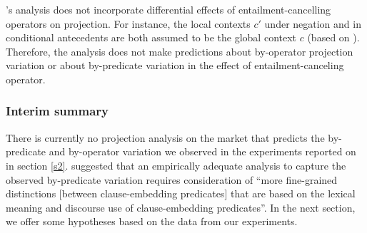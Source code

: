 \documentclass[a4paper,12pt,twoside]{article}
\newcommand{\poscite}[1]{\citeauthor{#1}'s \citeyear{#1}}
\begin{document}
\poscite{schlenker_triggering_2021} analysis does not incorporate differential effects of entailment-cancelling operators on projection. For instance, the local contexts $c'$ under negation and in conditional antecedents are both assumed to be the global context $c$ (based on \citealt{heim_projection_1983,schlenker_local_2009}). Therefore, the analysis does not make predictions about by-operator projection variation or about by-predicate variation in the effect of entailment-canceling operator.



\subsubsection{Interim summary}

There is currently no projection analysis on the market that predicts the by-predicate and by-operator variation we observed in the experiments reported on in section \ref{s2}. \citealt[585]{degen_are_2022} suggested that an empirically adequate analysis to capture the observed by-predicate variation requires consideration of ``more fine-grained distinctions [between clause-embedding predicates] that are based on the lexical meaning and discourse use of clause-embedding predicates''. In the next section, we offer some hypotheses based on the data from our experiments.


\end{document}
